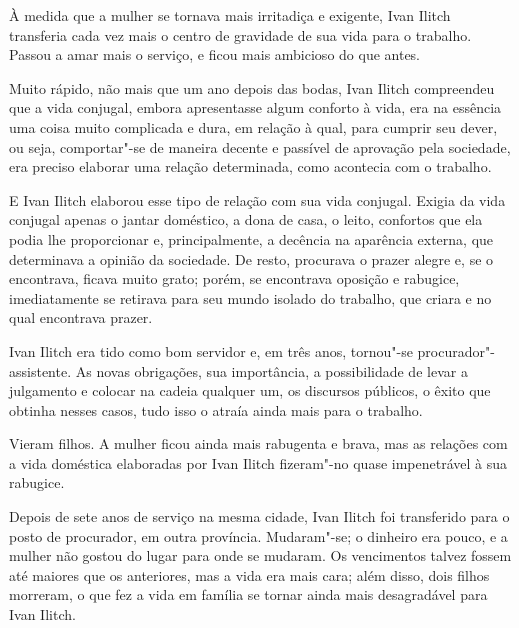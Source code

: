 À medida que a mulher se tornava mais irritadiça e exigente, Ivan Ilitch
transferia cada vez mais o centro de gravidade de sua vida para o
trabalho. Passou a amar mais o serviço, e ficou mais ambicioso do que
antes.

Muito rápido, não mais que um ano depois das bodas, Ivan Ilitch
compreendeu que a vida conjugal, embora apresentasse algum conforto à
vida, era na essência uma coisa muito complicada e dura, em relação à
qual, para cumprir seu dever, ou seja, comportar"-se de maneira decente e
passível de aprovação pela sociedade, era preciso elaborar uma relação
determinada, como acontecia com o trabalho.

E Ivan Ilitch elaborou esse tipo de relação com sua vida conjugal.
Exigia da vida conjugal apenas o jantar doméstico, a dona de casa, o
leito, confortos que ela podia lhe proporcionar e, principalmente, a
decência na aparência externa, que determinava a opinião da sociedade.
De resto, procurava o prazer alegre e, se o encontrava, ficava muito
grato; porém, se encontrava oposição e rabugice, imediatamente se
retirava para seu mundo isolado do trabalho, que criara e no qual
encontrava prazer.

Ivan Ilitch era tido como bom servidor e, em três anos, tornou"-se
procurador"-assistente. As novas obrigações, sua importância, a
possibilidade de levar a julgamento e colocar na cadeia qualquer um, os
discursos públicos, o êxito que obtinha nesses casos, tudo isso o atraía
ainda mais para o trabalho.

Vieram filhos. A mulher ficou ainda mais rabugenta e brava, mas as
relações com a vida doméstica elaboradas por Ivan Ilitch fizeram"-no
quase impenetrável à sua rabugice.

Depois de sete anos de serviço na mesma cidade, Ivan Ilitch foi
transferido para o posto de procurador, em outra província. Mudaram"-se;
o dinheiro era pouco, e a mulher não gostou do lugar para onde se
mudaram. Os vencimentos talvez fossem até maiores que os anteriores, mas
a vida era mais cara; além disso, dois filhos morreram, o que fez a vida
em família se tornar ainda mais desagradável para Ivan Ilitch.

